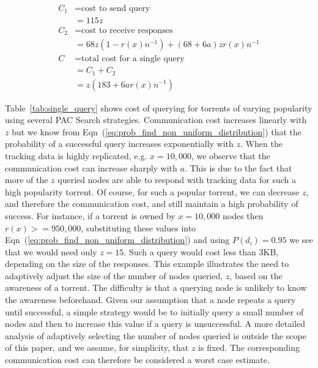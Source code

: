     \begin{align}
        C_1 &= \textrm{cost to send query}\\
            &= 115z\\
        C_2 &= \textrm{cost to receive responses}\\
            &= 68z(1-r(x)n^{-1}) + (68 + 6a)zr(x)n^{-1}\\
          C &= \textrm{total cost for a single query}\\
            &= C_1 + C_2\\
            &= z(183 + 6ar(x)n^{-1})
    \end{align}

    Table~\ref{tab:single_query} shows cost of querying for torrents of varying popularity using several PAC Search strategies. Communication cost increases linearly with $z$ but we know from Eqn~(\ref{eq:prob_find_non_uniform_distribution}) that the probability of a successful query increases exponentially with $z$. When the tracking data is highly replicated, e.g. $x=10,000$, we observe that the communication cost can increase sharply with $a$. This is due to the fact that more of the $z$ queried nodes are able to respond with tracking data for such a high popularity torrent. Of course, for such a popular torrent, we can decrease $z$, and therefore the communication cost, and still maintain a high probability of success. For instance, if a torrent is owned by $x=10,000$ nodes then $r(x) >= 950,000$, substituting these values into Eqn~(\ref{eq:prob_find_non_uniform_distribution}) and using $P(d_i)=0.95$ we see that we would need only $z=15$. Such a query would cost less than 3KB, depending on the size of the responses. This example illustrates the need to adaptively adjust the size of the number of nodes queried, $z$, based on the awareness of a torrent. The difficulty is that a querying node is unlikely to know the awareness beforehand.  Given our assumption that a node repeats a query until successful, a simple strategy would be to initially query a small number of nodes and then to increase this value if a query is unsuccessful. A more detailed analysis of adaptively selecting the number of nodes queried is outside the scope of this paper, and we assume, for simplicity, that $z$ is fixed. The corresponding communication cost can therefore be considered a worst case estimate.

